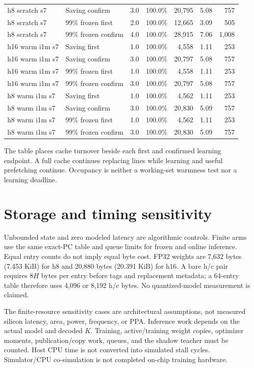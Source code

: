 \documentclass[10pt]{article}
\begin{document}
\begin{center}
\begin{longtable}{llrrrrr}
h8 scratch s7 & Saving confirm & 3.0 & 100.0\% & 20,795 & 5.08 & 757 \\
h8 scratch s7 & 99\% frozen first & 2.0 & 100.0\% & 12,665 & 3.09 & 505 \\
h8 scratch s7 & 99\% frozen confirm & 4.0 & 100.0\% & 28,915 & 7.06 & 1,008 \\
h16 warm i1m s7 & Saving first & 1.0 & 100.0\% & 4,558 & 1.11 & 253 \\
h16 warm i1m s7 & Saving confirm & 3.0 & 100.0\% & 20,797 & 5.08 & 757 \\
h16 warm i1m s7 & 99\% frozen first & 1.0 & 100.0\% & 4,558 & 1.11 & 253 \\
h16 warm i1m s7 & 99\% frozen confirm & 3.0 & 100.0\% & 20,797 & 5.08 & 757 \\
h8 warm i1m s7 & Saving first & 1.0 & 100.0\% & 4,562 & 1.11 & 253 \\
h8 warm i1m s7 & Saving confirm & 3.0 & 100.0\% & 20,830 & 5.09 & 757 \\
h8 warm i1m s7 & 99\% frozen first & 1.0 & 100.0\% & 4,562 & 1.11 & 253 \\
h8 warm i1m s7 & 99\% frozen confirm & 3.0 & 100.0\% & 20,830 & 5.09 & 757 \\
\bottomrule
\end{longtable}
\end{center}

The table places cache turnover beside each first and confirmed learning endpoint. A full cache continues replacing lines while learning and useful prefetching continue. Occupancy is neither a working-set warmness test nor a learning deadline.

\clearpage\section{Storage and timing sensitivity}

Unbounded state and zero modeled latency are algorithmic controls. Finite arms use the same exact-PC table and queue limits for frozen and online inference. Equal entry counts do not imply equal byte cost. FP32 weights are 7,632 bytes (7.453 KiB) for h8 and 20,880 bytes (20.391 KiB) for h16. A bare h/c pair requires $8H$ bytes per entry before tags and replacement metadata; a 64-entry table therefore uses 4,096 or 8,192 h/c bytes. No quantized-model measurement is claimed.

The finite-resource sensitivity cases are architectural assumptions, not measured silicon latency, area, power, frequency, or PPA. Inference work depends on the actual model and decoded $K$. Training, active/training weight copies, optimizer moments, publication/copy work, queues, and the shadow teacher must be counted. Host CPU time is not converted into simulated stall cycles. Simulator/CPU co-simulation is not completed on-chip training hardware.
\end{document}
